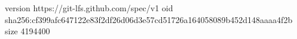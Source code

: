 version https://git-lfs.github.com/spec/v1
oid sha256:cf399afc647122e83f2df26d06d3e57cd51726a164058089b452d148aaaa4f2b
size 4194400

